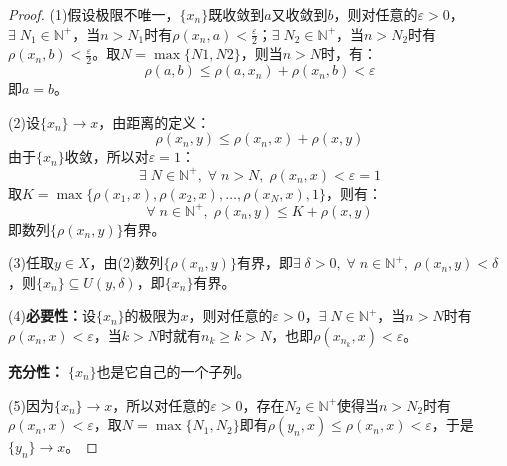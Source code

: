 \begin{proof}
	(1)假设极限不唯一，$\{x_n\}$既收敛到$a$又收敛到$b$，则对任意的$\varepsilon>0$，$\exists\; N_1\in\mathbb{N}^+$，当$n>N_1$时有$\rho(x_n,a)<\frac{\varepsilon}{2}$；$\exists\; N_2\in\mathbb{N}^+$，当$n>N_2$时有$\rho(x_n,b)<\frac{\varepsilon}{2}$。取$N=\max\{N1,N2\}$，则当$n>N$时，有：
	\begin{equation*}
		\rho(a,b)\leqslant\rho(a,x_n)+\rho(x_n,b)<\varepsilon
	\end{equation*}
	即$a=b$。\par
	(2)设$\{x_n\}\to x$，由距离的定义：
	\begin{equation*}
		\rho(x_n,y)\leqslant\rho(x_n,x)+\rho(x,y)
	\end{equation*}
	由于$\{x_n\}$收敛，所以对$\varepsilon=1$：
	\begin{equation*}
		\exists\;N\in\mathbb{N}^+,\;\forall\;n>N,\;\rho(x_n,x)<\varepsilon=1
	\end{equation*}
	取$K=\max\{\rho(x_1,x),\rho(x_2,x),\dots,\rho(x_N,x),1\}$，则有：
	\begin{equation*}
		\forall\;n\in\mathbb{N}^+,\;\rho(x_n,y)\leqslant K+\rho(x,y)
	\end{equation*}
	即数列$\{\rho(x_n,y)\}$有界。\par
	(3)任取$y\in X$，由(2)数列$\{\rho(x_n,y)\}$有界，即$\exists\;\delta>0,\;\forall\;n\in\mathbb{N}^+,\;\rho(x_n,y)<\delta$，则$\{x_n\}\subseteq U(y,\delta)$，即$\{x_n\}$有界。\par
	(4)\textbf{必要性：}设$\{x_n\}$的极限为$x$，则对任意的$\varepsilon>0$，$\exists\; N\in\mathbb{N}^+$，当$n>N$时有$\rho(x_n,x)<\varepsilon$，当$k>N$时就有$n_k\geqslant k>N$，也即$\rho(x_{n_k},x)<\varepsilon$。\par
	\textbf{充分性：}$\;\{x_n\}$也是它自己的一个子列。\par
	(5)因为$\{x_n\}\to x$，所以对任意的$\varepsilon>0$，存在$N_2\in\mathbb{N}^+$使得当$n>N_2$时有$\rho(x_n,x)<\varepsilon$，取$N=\max\{N_1,N_2\}$即有$\rho(y_n,x)\leqslant\rho(x_n,x)<\varepsilon$，于是$\{y_n\}\to x$。
\end{proof}



